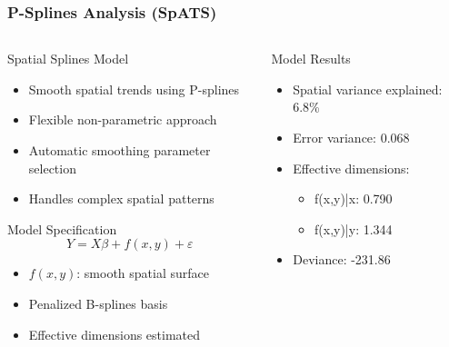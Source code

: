 \documentclass[aspectratio=43]{beamer}
\begin{document}
\begin{frame}
    \frametitle{P-Splines Analysis (SpATS)}
    
    \begin{columns}[T]
        \begin{column}{0.5\textwidth}
            \begin{block}{Spatial Splines Model}
                \begin{itemize}
                    \item Smooth spatial trends using P-splines
                    \item Flexible non-parametric approach
                    \item Automatic smoothing parameter selection
                    \item Handles complex spatial patterns
                \end{itemize}
            \end{block}
            
            \begin{block}{Model Specification}
                $$Y = X\beta + f(x,y) + \varepsilon$$
                \begin{itemize}
                    \item $f(x,y)$: smooth spatial surface
                    \item Penalized B-splines basis
                    \item Effective dimensions estimated
                \end{itemize}
            \end{block}
        \end{column}
        
        \begin{column}{0.5\textwidth}
            \begin{block}{Model Results}
                \begin{itemize}
                    \item Spatial variance explained: 6.8\%
                    \item Error variance: 0.068
                    \item Effective dimensions:
                    \begin{itemize}
                        \scriptsize
                        \item f(x,y)|x: 0.790
                        \item f(x,y)|y: 1.344
                    \end{itemize}
                    \item Deviance: -231.86
                \end{itemize}
            \end{block}
            

\end{column}
\end{columns}
\end{frame}
\end{document}
